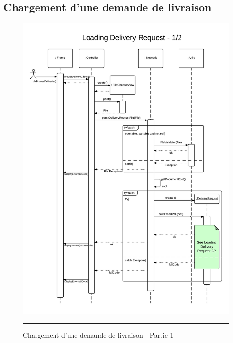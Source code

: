 \subsection{Chargement d'une demande de livraison}
\begin{figure}[H]
	\centering
		\includegraphics[width=\textwidth,height=\textheight,keepaspectratio]{Figures/chargement1}
		\rule{35em}{0.5pt}
	\caption[Chargement d'une demande de livraison - Partie 1]{Chargement d'une demande de livraison - Partie 1}
\end{figure}

